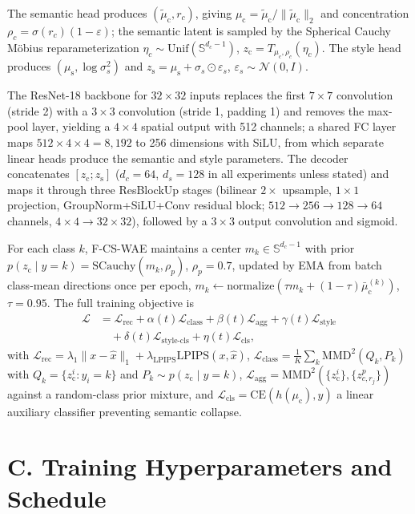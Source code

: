 \documentclass[letterpaper]{article} %
\newcommand{\ours}{F-CS-WAE}
\newcommand{\zc}{z_{\mathrm{c}}}
\newcommand{\zs}{z_{\mathrm{s}}}
\newcommand{\muc}{\mu_{\mathrm{c}}}
\newcommand{\mus}{\mu_{\mathrm{s}}}
\newcommand{\Sph}{\mathbb{S}}
\newcommand{\MMD}{\mathrm{MMD}}
\newcommand{\CE}{\mathrm{CE}}
\newcommand{\SCauchy}{\mathrm{SCauchy}}
\begin{document}
The semantic head produces $(\tilde\muc,r_c)$, giving
$\muc=\tilde\muc/\|\tilde\muc\|_2$ and concentration
$\rho_c=\sigma(r_c)(1-\varepsilon)$; the semantic latent is sampled by the
Spherical Cauchy M\"obius reparameterization
$\eta_c\sim\mathrm{Unif}(\Sph^{d_c-1})$, $\zc=T_{\muc,\rho_c}(\eta_c)$. The
style head produces $(\mus,\log\sigma_s^2)$ and $\zs=\mus+\sigma_s\odot
\varepsilon_s$, $\varepsilon_s\sim\mathcal N(0,I)$.

The ResNet-18 backbone for $32\times32$ inputs replaces the first $7\times7$
convolution (stride 2) with a $3\times3$ convolution (stride 1, padding 1)
and removes the max-pool layer, yielding a $4\times4$ spatial output with 512
channels; a shared FC layer maps $512\times4\times4{=}8{,}192$ to 256
dimensions with SiLU, from which separate linear heads produce the semantic
and style parameters. The decoder concatenates $[\zc;\zs]$ ($d_c{=}64$,
$d_s{=}128$ in all experiments unless stated) and maps it through three
ResBlockUp stages (bilinear $2\times$ upsample, $1\times1$ projection,
GroupNorm+SiLU+Conv residual block; $512{\to}256{\to}128{\to}64$ channels,
$4\times4\to32\times32$), followed by a $3\times3$ output convolution and
sigmoid.

For each class $k$, \ours{} maintains a center $m_k\in\Sph^{d_c-1}$ with
prior $p(\zc\mid y{=}k)=\SCauchy(m_k,\rho_p)$, $\rho_p{=}0.7$, updated by EMA
from batch class-mean directions once per epoch,
$m_k\leftarrow\mathrm{normalize}(\tau m_k+(1-\tau)\bar\muc^{(k)})$,
$\tau{=}0.95$. The full training objective is
\begin{align*}
  \mathcal{L} &= \mathcal{L}_{\mathrm{rec}} + \alpha(t)\mathcal{L}_{\mathrm{class}}
   + \beta(t)\mathcal{L}_{\mathrm{agg}} + \gamma(t)\mathcal{L}_{\mathrm{style}}\\
  &\quad + \delta(t)\mathcal{L}_{\mathrm{style\text{-}cls}} + \eta(t)\mathcal{L}_{\mathrm{cls}},
\end{align*}
with
$\mathcal{L}_{\mathrm{rec}}=\lambda_1\|x-\hat x\|_1+\lambda_{\mathrm{LPIPS}}\mathrm{LPIPS}(x,\hat x)$,
$\mathcal{L}_{\mathrm{class}}=\frac1K\sum_k\MMD^2(Q_k,P_k)$ with
$Q_k=\{\zc^i{:}y_i{=}k\}$ and $P_k\sim p(\zc\mid y{=}k)$,
$\mathcal{L}_{\mathrm{agg}}=\MMD^2(\{\zc^i\},\{z_{c,r_j}^p\})$ against a
random-class prior mixture, and $\mathcal{L}_{\mathrm{cls}}=\CE(h(\muc),y)$ a
linear auxiliary classifier preventing semantic collapse.

\section{C. Training Hyperparameters and Schedule}
\end{document}
